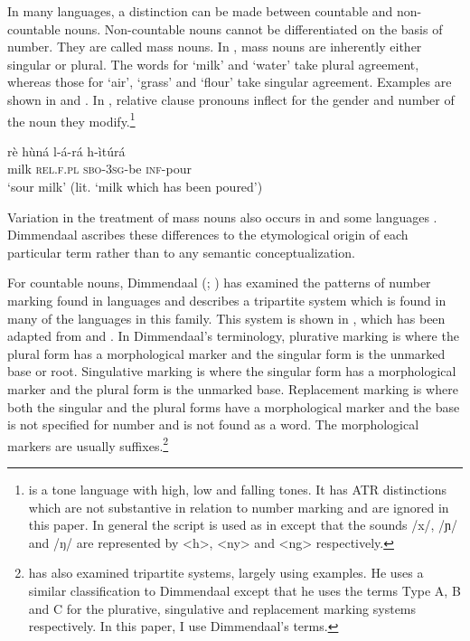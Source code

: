 \documentclass[output=paper]{langsci/langscibook}
\begin{document}
In many languages, a distinction can be made between countable and non-countable nouns. Non-countable nouns cannot be differentiated on the basis of number. They are called mass nouns. In , mass nouns are inherently either singular or plural.  The words for ‘milk’ and ‘water’ take plural agreement, whereas those for ‘air’, ‘grass’ and ‘flour’ take singular agreement. Examples are shown in  and . In , relative clause pronouns inflect for the gender and number of the noun they modify.\footnote{ is a tone language with high, low and falling tones. It has ATR distinctions which are not substantive in relation to number marking and are ignored in this paper. In general the  script is used as in  except that the sounds /x/, /ɲ/ and /ŋ/ are represented by <h>, <ny> and <ng> respectively.}

\ea\label{ex:moodie:1}
\gll rè hùná l-á-rá h-ìtúrá \\
milk \textsc{rel.f.pl} \textsc{sbo-3sg}-be \textsc{inf}-pour \\
\glt ‘sour milk’ (lit. ‘milk which has been poured’)
\z

\ea\label{ex:moodie:2}

\z
\z

Variation in the treatment of mass nouns also occurs in  \citep[224]{Dimmendaal1983} and some  languages \citep[173]{Corbett2000}. Dimmendaal ascribes these differences to the etymological origin of each particular term \citep[230]{Dimmendaal2000} rather than to any semantic conceptualization.

For countable nouns, Dimmendaal (\citeyear[224]{Dimmendaal1983}; \citeyear[214]{Dimmendaal2000}) has examined the patterns of number marking found in  languages and describes a tripartite system which is found in many of the languages in this family. This system is shown in , which has been adapted from \citet[224]{Dimmendaal1983} and \citet[156]{Corbett2000}. In Dimmendaal’s terminology, plurative marking is where the plural form has a morphological marker and the singular form is the unmarked base or root. Singulative marking is where the singular form has a morphological marker and the plural form is the unmarked base. Replacement marking is where both the singular and the plural forms have a morphological marker and the base is not specified for number and is not found as a word. The morphological markers are usually suffixes.\footnote{\citet[156]{Corbett2000} has also examined tripartite systems, largely using  examples. He uses a similar classification to Dimmendaal except that he uses the terms Type A, B and C for the plurative, singulative and replacement marking systems respectively. In this paper, I use Dimmendaal’s terms.}
\end{document}

